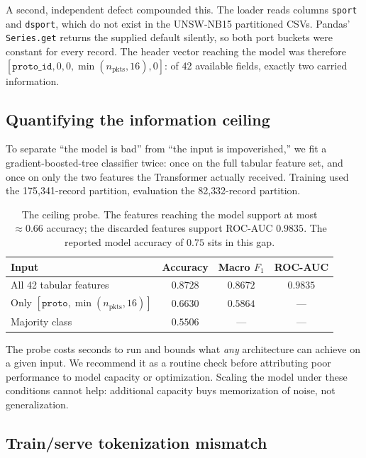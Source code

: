 \documentclass[11pt]{article}
\begin{document}
A second, independent defect compounded this. The loader reads columns
\texttt{sport} and \texttt{dsport}, which do not exist in the UNSW-NB15
partitioned CSVs. Pandas' \texttt{Series.get} returns the supplied default
silently, so both port buckets were constant for every record. The header vector
reaching the model was therefore
$[\texttt{proto\_id}, 0, 0, \min(n_{\text{pkts}}, 16), 0]$: of 42 available
fields, exactly two carried information.

\subsection{Quantifying the information ceiling}
\label{sec:ceiling}

To separate ``the model is bad'' from ``the input is impoverished,'' we fit a
gradient-boosted-tree classifier \citep{friedman2001greedy} twice: once on the
full tabular feature set, and once on only the two features the Transformer
actually received. Training used the 175{,}341-record partition, evaluation the
82{,}332-record partition.

\begin{table}[h]
\centering
\begin{tabular}{lccc}
\toprule
Input & Accuracy & Macro $F_1$ & ROC-AUC \\
\midrule
All 42 tabular features & $0.8728$ & $0.8672$ & $\mathbf{0.9835}$ \\
Only $[\texttt{proto}, \min(n_{\text{pkts}},16)]$ & $0.6630$ & $0.5864$ & --- \\
Majority class & $0.5506$ & --- & --- \\
\bottomrule
\end{tabular}
\caption{The ceiling probe. The features reaching the model support at most
$\approx 0.66$ accuracy; the discarded features support ROC-AUC $0.9835$. The
reported model accuracy of $0.75$ sits in this gap.}
\label{tab:ceiling}
\end{table}

The probe costs seconds to run and bounds what \emph{any} architecture can
achieve on a given input. We recommend it as a routine check before attributing
poor performance to model capacity or optimization. Scaling the model under
these conditions cannot help: additional capacity buys memorization of
noise, not generalization.

\subsection{Train/serve tokenization mismatch}
\label{sec:skew}
\end{document}
